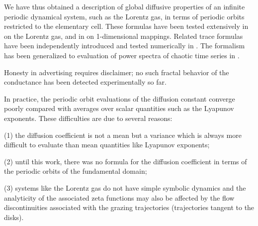 


We have thus obtained a description of global diffusive properties of an
infinite periodic dynamical system, such as the Lorentz gas, in terms of
periodic orbits restricted to the elementary cell. These formulas have
been tested extensively in  on the Lorentz gas,
and in  on 1-dimensional mappings. Related trace formulas
have been independently introduced and tested numerically in
. The formalism has been generalized to evaluation of
power spectra of chaotic time series in .

Honesty in advertising requires disclaimer; no such fractal behavior of
the conductance has been detected experimentally so far.

In practice, the periodic orbit evaluations
of the diffusion constant converge poorly compared with averages over scalar
quantities such as the Lyapunov exponents.  These difficulties are due to
several reasons:

(1) the diffusion coefficient is not a mean but a variance which is
always more difficult to evaluate than mean quantities like Lyapunov
exponents;

(2) until this work, there was no formula for the diffusion coefficient in
terms of the periodic orbits of the fundamental domain;

(3) systems like the Lorentz gas do not have simple symbolic dynamics and
the analyticity of the associated zeta functions may also be affected by
the flow discontinuities associated with the grazing trajectories
(trajectories tangent to the disks).
